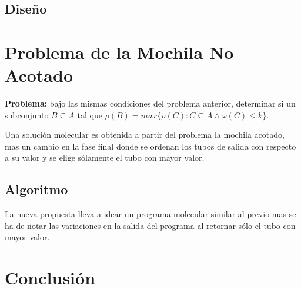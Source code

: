 \documentclass[12pt, letterpaper, twoside]{article}
\begin{document}
    \subsection{Diseño}
    \newpage
    \section{Problema de la Mochila No Acotado}
    \textbf{Problema:} bajo las mismas condiciones del problema anterior, determinar si un subconjunto $B\subseteq A$ tal que $\rho(B) =max\{\rho(C):C\subseteq A \land\omega(C) \leq k\}$.


    Una solución molecular es obtenida a partir del problema la mochila acotado, mas un cambio en la fase final donde se ordenan los tubos de salida con respecto a su valor y se elige sólamente el tubo con mayor valor.

    \subsection{Algoritmo}
    La nueva propuesta lleva a idear un programa molecular similar al previo mas se ha de notar las variaciones en la salida del programa al retornar sólo el tubo con mayor valor.
    \begin{algorithm}
        \begin{algorithmic}[1]
            \EndFor
                \Else
                \EndIf
            \EndWhile
            \EndProcedure
        \end{algorithmic}
    \end{algorithm}

    \section{Conclusión}
    \printbibliography
\end{document}
